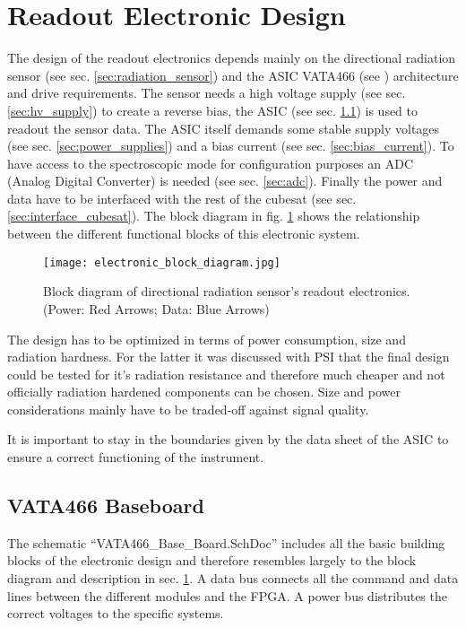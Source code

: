 \section{Readout Electronic Design}
\label{sec:electronic_design}
The design of the readout electronics depends mainly on the directional radiation sensor (see sec. \ref{sec:radiation_sensor}) and the ASIC VATA466 (see \cite{Meier2016VATA466}) architecture and drive requirements.
The sensor needs a high voltage supply (see sec. \ref{sec:hv_supply}) to create a reverse bias, the ASIC (see sec. \ref{sec:vata466_baseboard}) is used to readout the sensor data.
The ASIC itself demands some stable supply voltages (see sec. \ref{sec:power_supplies}) and a bias current (see sec. \ref{sec:bias_current}).
To have access to the spectroscopic mode for configuration purposes an ADC (Analog Digital Converter) is needed (see sec. \ref{sec:adc}).
Finally the power and data have to be interfaced with the rest of the cubesat (see sec. \ref{sec:interface_cubesat}).
The block diagram in fig. \ref{fig:electronic_block_diagram} shows the relationship between the different functional blocks of this electronic system.
\begin{figure}[H]
    \centering
    \texttt{[image: electronic\_block\_diagram.jpg]}
    \caption[Block Diagram Readout Electronics]{Block diagram of directional radiation sensor's readout electronics. \\    (Power: Red Arrows; Data: Blue Arrows)}
    \label{fig:electronic_block_diagram}
\end{figure}

The design has to be optimized in terms of power consumption, size and radiation hardness. 
For the latter it was discussed with PSI that the final design could be tested for it's radiation resistance and therefore much cheaper and not officially radiation hardened components can be chosen.
Size and power considerations mainly have to be traded-off against signal quality.

It is important to stay in the boundaries given by the data sheet of the ASIC to ensure a correct functioning of the instrument.

\subsection{VATA466 Baseboard}
\label{sec:vata466_baseboard}
The schematic ``VATA466\_Base\_Board.SchDoc'' includes all the basic building blocks of the electronic design and therefore resembles largely to the block diagram and description in sec. \ref{sec:electronic_design}.
A data bus connects all the command and data lines between the different modules and the FPGA.
A power bus distributes the correct voltages to the specific systems.

